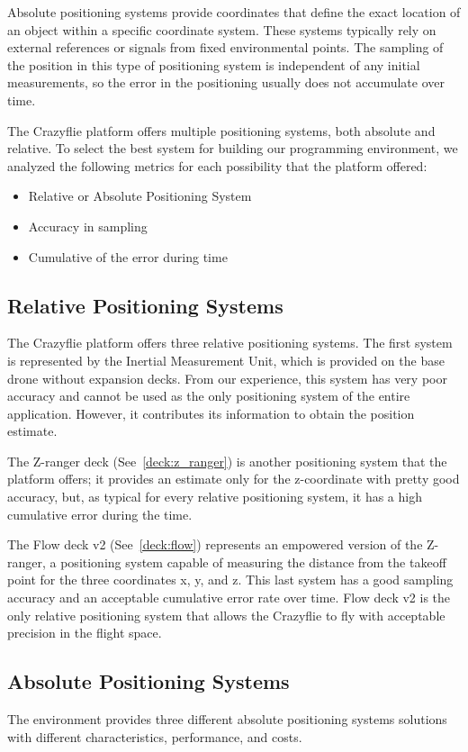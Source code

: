 Absolute positioning systems provide coordinates that define the exact location of an object within a specific coordinate system. 
These systems typically rely on external references or signals from fixed environmental points.
The sampling of the position in this type of positioning system is independent of any initial measurements, so the error in the positioning usually does not accumulate over time.


The Crazyflie platform offers multiple positioning systems, both absolute and relative. 
To select the best system for building our programming environment, we analyzed the following metrics for each possibility that the platform offered:
\begin{itemize}
    \item Relative or Absolute Positioning System
    \item Accuracy in sampling
    \item Cumulative of the error during time
\end{itemize}


\subsection{Relative Positioning Systems}\label{subsec:relative_positioning_systems}
The Crazyflie platform offers three relative positioning systems. 
The first system is represented by the Inertial Measurement Unit, which is provided on the base drone without expansion decks. 
From our experience, this system has very poor accuracy and cannot be used as the only positioning system of the entire application.
However, it contributes its information to obtain the position estimate.

The Z-ranger deck (See~\ref{deck:z_ranger}) is another positioning system that the platform offers; it provides an estimate only for the z-coordinate with pretty good accuracy, but, as typical for every relative positioning system, it has a high cumulative error during the time. 

The Flow deck v2 (See~\ref{deck:flow}) represents an empowered version of the Z-ranger, a positioning system capable of measuring the distance from the takeoff point for the three coordinates x, y, and z. 
This last system has a good sampling accuracy and an acceptable cumulative error rate over time. 
Flow deck v2 is the only relative positioning system that allows the Crazyflie to fly with acceptable precision in the flight space.


\subsection{Absolute Positioning Systems}\label{subsec:absolute_positioning_systems}
The environment provides three different absolute positioning systems solutions with different characteristics, performance, and costs. 

